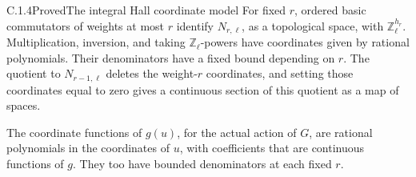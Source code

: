 \begin{result}{C.1.4}{Proved}{The integral Hall coordinate model}
\label{lem:ghost-hall-model}
For fixed \(r\), ordered basic commutators of weights at most
\(r\) identify \(N_{r,\ell}\), as a topological space, with
\(\mathbb Z_\ell^{h_r}\). Multiplication, inversion, and taking
\(\mathbb Z_\ell\)-powers have coordinates given by rational
polynomials. Their denominators have a fixed bound depending on
\(r\). The quotient to \(N_{r-1,\ell}\) deletes the weight-\(r\)
coordinates, and setting those coordinates equal to zero gives a
continuous section of this quotient as a map of spaces.

The coordinate functions of \(g(u)\), for the actual action of
\(G\), are rational polynomials in the coordinates of \(u\),
with coefficients that are continuous functions of \(g\).
They too have bounded denominators at each fixed \(r\).
\end{result}
